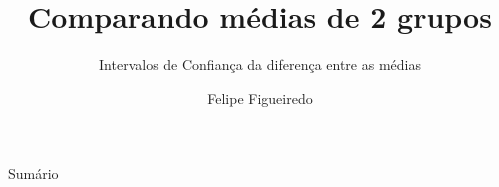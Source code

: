 \documentclass{beamer}
\title%
{Comparando médias de 2 grupos}
\subtitle
{Intervalos de Confiança da diferença entre as médias} %
\author%
{Felipe Figueiredo}%
\institute[] %
{
}
\date%
{}
\begin{document}
\begin{frame}
  \titlepage
\end{frame}

\begin{frame}{Sumário}
  \tableofcontents
\end{frame}








\end{document}
